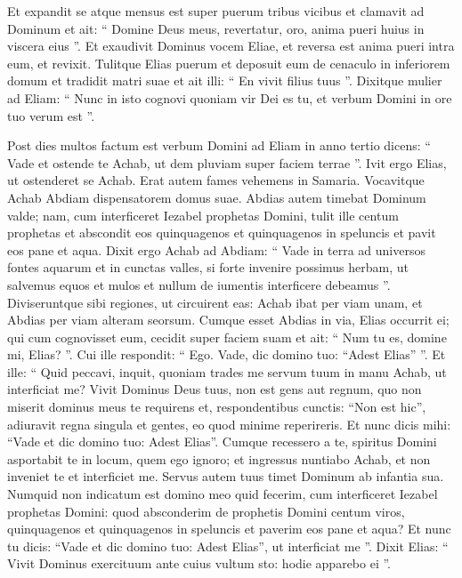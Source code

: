 \begin{biblechapter}
\begin{biblechapter}
\begin{biblechapter}
\begin{biblechapter}
\begin{biblechapter}
\begin{biblechapter}
\begin{biblechapter}
\begin{biblechapter}
\begin{biblechapter}
\begin{biblechapter}
\begin{biblechapter}
\begin{biblechapter}
\begin{biblechapter}
\begin{biblechapter}
\begin{biblechapter}
\begin{biblechapter}
\begin{biblechapter}
\verse Et expandit se atque mensus est super puerum tribus vicibus et clamavit ad Dominum et ait: “ Domine Deus meus, revertatur, oro, anima pueri huius in viscera eius ”. 
\verse Et exaudivit Dominus vocem Eliae, et reversa est anima pueri intra eum, et revixit. 
\verse Tulitque Elias puerum et deposuit eum de cenaculo in inferiorem domum et tradidit matri suae et ait illi: “ En vivit filius tuus ”. 
\verse Dixitque mulier ad Eliam: “ Nunc in isto cognovi quoniam vir Dei es tu, et verbum Domini in ore tuo verum est ”.
 
\begin{biblechapter}
\verse Post dies multos factum est verbum Domini ad Eliam in anno tertio dicens: “ Vade et ostende te Achab, ut dem pluviam super faciem terrae ”. 
\verse Ivit ergo Elias, ut ostenderet se Achab.
 Erat autem fames vehemens in Samaria. 
\verse Vocavitque Achab Abdiam dispensatorem domus suae. Abdias autem timebat Dominum valde; 
\verse nam, cum interficeret Iezabel prophetas Domini, tulit ille centum prophetas et abscondit eos quinquagenos et quinquagenos in speluncis et pavit eos pane et aqua. 
\verse Dixit ergo Achab ad Abdiam: “ Vade in terra ad universos fontes aquarum et in cunctas valles, si forte invenire possimus herbam, ut salvemus equos et mulos et nullum de iumentis interficere debeamus ”. 
\verse Diviseruntque sibi regiones, ut circuirent eas: Achab ibat per viam unam, et Abdias per viam alteram seorsum.
 \verse Cumque esset Abdias in via, Elias occurrit ei; qui cum cognovisset eum, cecidit super faciem suam et ait: “ Num tu es, domine mi, Elias? ”. 
\verse Cui ille respondit: “ Ego. Vade, dic domino tuo: “Adest Elias” ”. 
\verse Et ille: “ Quid peccavi, inquit, quoniam trades me servum tuum in manu Achab, ut interficiat me? 
\verse Vivit Dominus Deus tuus, non est gens aut regnum, quo non miserit dominus meus te requirens et, respondentibus cunctis: “Non est hic”, adiuravit regna singula et gentes, eo quod minime reperireris. 
\verse Et nunc dicis mihi: “Vade et dic domino tuo: Adest Elias”. 
\verse Cumque recessero a te, spiritus Domini asportabit te in locum, quem ego ignoro; et ingressus nuntiabo Achab, et non inveniet te et interficiet me. Servus autem tuus timet Dominum ab infantia sua. 
\verse Numquid non indicatum est domino meo quid fecerim, cum interficeret Iezabel prophetas Domini: quod absconderim de prophetis Domini centum viros, quinquagenos et quinquagenos in speluncis et paverim eos pane et aqua? 
\verse Et nunc tu dicis: “Vade et dic domino tuo: Adest Elias”, ut interficiat me ”. 
\verse Dixit Elias: “ Vivit Dominus exercituum ante cuius vultum sto: hodie apparebo ei ”.

\end{biblechapter}
\end{biblechapter}
\end{biblechapter}
\end{biblechapter}
\end{biblechapter}
\end{biblechapter}
\end{biblechapter}
\end{biblechapter}
\end{biblechapter}
\end{biblechapter}
\end{biblechapter}
\end{biblechapter}
\end{biblechapter}
\end{biblechapter}
\end{biblechapter}
\end{biblechapter}
\end{biblechapter}
\end{biblechapter}
